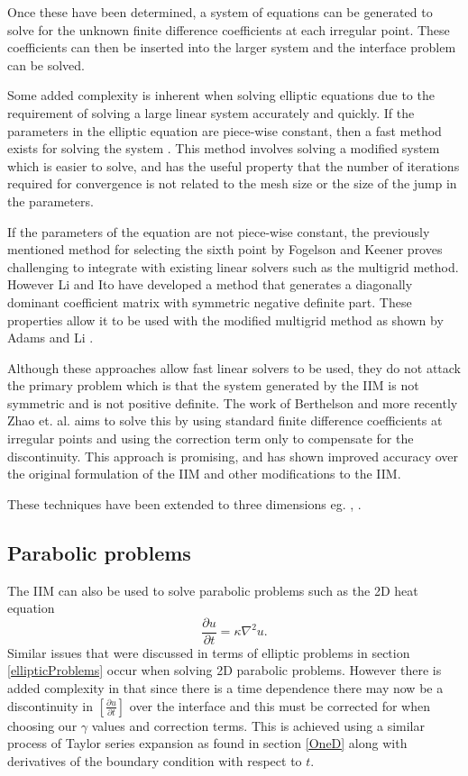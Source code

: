 Once these have been determined, a system of equations can be generated to solve for the unknown finite difference coefficients at each irregular point.
These coefficients can then be inserted into the larger system and the interface problem can be solved.

Some added complexity is inherent when solving elliptic equations due to the requirement of solving a large linear system accurately and quickly.
If the parameters in the elliptic equation are piece-wise constant, then a fast method exists for solving the system \cite{li98}.
This method involves solving a modified system which is easier to solve, and has the useful property that the number of iterations required for convergence is not related to the mesh size or the size of the jump in the parameters.

If the parameters of the equation are not piece-wise constant, the previously mentioned method for selecting the sixth point by Fogelson and Keener \cite{fogelsonkeener00} proves challenging to integrate with existing linear solvers such as the multigrid method.
However Li and Ito \cite{liito01} have developed a method that generates a diagonally dominant coefficient matrix with symmetric negative definite part.
These properties allow it to be used with the modified multigrid method as shown by Adams and Li \cite{adamsli02}.

Although these approaches allow fast linear solvers to be used, they do not attack the primary problem which is that the system generated by the IIM is not symmetric and is not positive definite.
The work of Berthelson \cite{berthelson04} and more recently Zhao et. al. \cite{zhaohouli12} aims to solve this by using standard finite difference coefficients at irregular points and using the correction term only to compensate for the discontinuity.
This approach is promising, and has shown improved accuracy over the original formulation of the IIM and other modifications to the IIM.

These techniques have been extended to three dimensions eg. \cite{dengitoli03}, \cite{dumettkeener03}.

\subsection{Parabolic problems}
The IIM can also be used to solve parabolic problems such as the 2D heat equation
\begin{equation}
    \frac{\partial u}{\partial t} = \kappa \nabla^2 u.
\end{equation}
Similar issues that were discussed in terms of elliptic problems in section \ref{ellipticProblems} occur when solving 2D parabolic problems. 
However there is added complexity in that since there is a time dependence there may now be a discontinuity in $\left[\frac{\partial u}{\partial t}\right]$ over the interface and this must be corrected for when choosing our $\gamma$ values and correction terms.
This is achieved using a similar process of Taylor series expansion as found in section \ref{OneD} along with derivatives of the boundary condition with respect to $t$.

